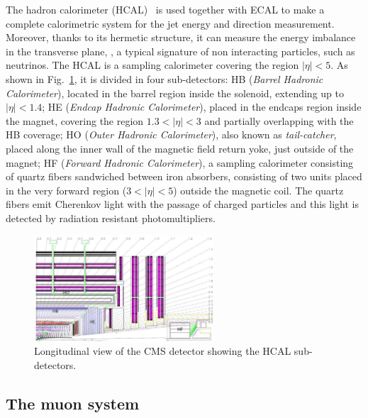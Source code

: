 The hadron calorimeter (HCAL)~\cite{hcal} is used together with ECAL to make a complete calorimetric system for the jet energy and direction measurement. Moreover, thanks to its hermetic structure, it can measure the energy imbalance in the transverse plane, \MET, a typical signature of non interacting particles, such as neutrinos. The HCAL is a sampling calorimeter covering the region $|\eta|<5$. As shown in Fig.~\ref{fig:hcal}, it is divided in four sub-detectors: HB (\emph{Barrel Hadronic Calorimeter}), located in the barrel region inside the solenoid, extending up to $|\eta|<1.4$; HE (\emph{Endcap Hadronic Calorimeter}), placed in the endcaps region inside the magnet, covering the region $1.3 < |\eta| < 3$ and partially overlapping with the HB coverage; HO (\emph{Outer Hadronic Calorimeter}), also known as \emph{tail-catcher}, placed along the inner wall of the magnetic field return yoke, just outside of the magnet; HF (\emph{Forward Hadronic Calorimeter}), a sampling calorimeter consisting of quartz fibers sandwiched between iron absorbers,
consisting of two units placed in the very forward region ($3<|\eta|<5$) outside the magnetic coil. The quartz fibers emit Cherenkov light with the passage of charged particles and this light is detected by radiation resistant photomultipliers.
\begin{figure}[htb]
\centering
\includegraphics[width=0.6\textwidth]{images/hcal.png}
\caption{Longitudinal view of the CMS detector showing the HCAL sub-detectors.}\label{fig:hcal}
\end{figure}
\subsection{The muon system}

